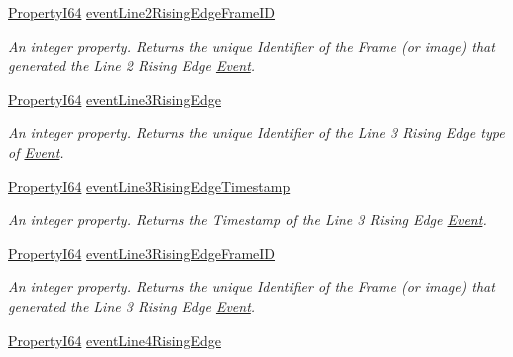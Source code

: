 \begin{DoxyCompactItemize}
\hyperlink{group___common_interface_ga81749b2696755513663492664a18a893}{Property\+I64} \hyperlink{classmv_i_m_p_a_c_t_1_1acquire_1_1_gen_i_cam_1_1_event_control_af01ee6d71d738c30ed1e5a7cdcd439da}{event\+Line2\+Rising\+Edge\+Frame\+I\+D}
\begin{DoxyCompactList}\small\item\em An integer property. Returns the unique Identifier of the Frame (or image) that generated the Line 2 Rising Edge \hyperlink{classmv_i_m_p_a_c_t_1_1acquire_1_1_event}{Event}. \end{DoxyCompactList}\item 
\hyperlink{group___common_interface_ga81749b2696755513663492664a18a893}{Property\+I64} \hyperlink{classmv_i_m_p_a_c_t_1_1acquire_1_1_gen_i_cam_1_1_event_control_a86db5460242e14cafc909ed328f6f234}{event\+Line3\+Rising\+Edge}
\begin{DoxyCompactList}\small\item\em An integer property. Returns the unique Identifier of the Line 3 Rising Edge type of \hyperlink{classmv_i_m_p_a_c_t_1_1acquire_1_1_event}{Event}. \end{DoxyCompactList}\item 
\hyperlink{group___common_interface_ga81749b2696755513663492664a18a893}{Property\+I64} \hyperlink{classmv_i_m_p_a_c_t_1_1acquire_1_1_gen_i_cam_1_1_event_control_a281845677fae4f46e5f05e7b3e236c4b}{event\+Line3\+Rising\+Edge\+Timestamp}
\begin{DoxyCompactList}\small\item\em An integer property. Returns the Timestamp of the Line 3 Rising Edge \hyperlink{classmv_i_m_p_a_c_t_1_1acquire_1_1_event}{Event}. \end{DoxyCompactList}\item 
\hyperlink{group___common_interface_ga81749b2696755513663492664a18a893}{Property\+I64} \hyperlink{classmv_i_m_p_a_c_t_1_1acquire_1_1_gen_i_cam_1_1_event_control_ace4dce3f25b85860b0c7b124bcbdd3ba}{event\+Line3\+Rising\+Edge\+Frame\+I\+D}
\begin{DoxyCompactList}\small\item\em An integer property. Returns the unique Identifier of the Frame (or image) that generated the Line 3 Rising Edge \hyperlink{classmv_i_m_p_a_c_t_1_1acquire_1_1_event}{Event}. \end{DoxyCompactList}\item 
\hyperlink{group___common_interface_ga81749b2696755513663492664a18a893}{Property\+I64} \hyperlink{classmv_i_m_p_a_c_t_1_1acquire_1_1_gen_i_cam_1_1_event_control_a54484f39df6ce0946e21f133f93a0be8}{event\+Line4\+Rising\+Edge}

\end{DoxyCompactItemize}
